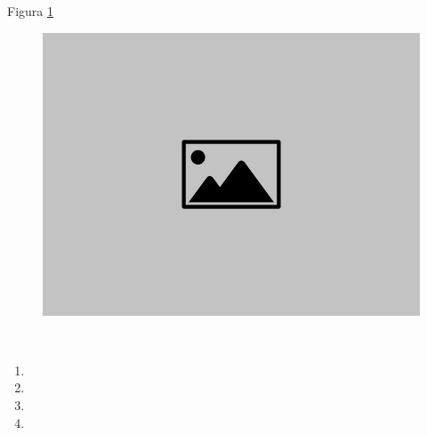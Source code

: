     \begin{justify}
       \lipsum[4][1-5] Figura \ref{fig:img_example2} \lipsum[4][6-15] \\
    \end{justify}
    
    \begin{figure}[!ht]
        \centering
        \includegraphics[scale=0.2]{img/default-image.jpg}
        \caption{\lipsum[2][1]}
        \label{fig:img_example2}
    \end{figure}
    
    \begin{justify}
        \lipsum[1][1-10]  \lipsum[1][1-15] \\
    \end{justify}

    \begin{enumerate}
        \item \lipsum[3][1]
        \item \lipsum[3][2]
        \item \lipsum[3][3]
        \item \lipsum[3][4]
    \end{enumerate}

    \begin{justify}
        \lipsum[1]\\
    \end{justify}